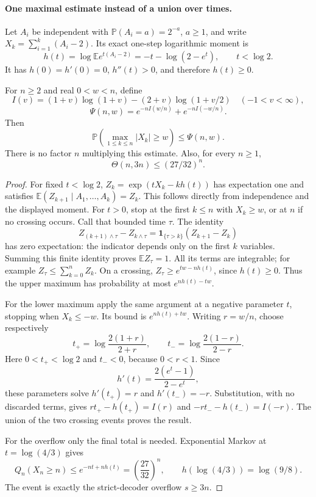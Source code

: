 \paragraph{One maximal estimate instead of a union over times.}
Let $A_i$ be independent with $\mathbb P(A_i=a)=2^{-a}$,
$a\ge1$, and write $X_k=\sum_{i=1}^k(A_i-2)$.
Its exact one-step logarithmic moment is
\[
 h(t)=\log\mathbb E e^{t(A_i-2)}
     =-t-\log(2-e^t),\qquad t<\log2.
\]
It has $h(0)=h'(0)=0$, $h''(t)>0$, and therefore $h(t)\ge0$.

\begin{proposition}
\label{prop:Mazur-maximal-tail}
For $n\ge2$ and real $0<w<n$, define
\[
 I(v)=(1+v)\log(1+v)-(2+v)\log(1+v/2)
       \quad(-1<v<\infty),
\]
\begin{equation}
 \Psi(n,w)=e^{-nI(w/n)}+e^{-nI(-w/n)}.
 \label{eq:Mazur-maximal-rate}
\end{equation}
Then
\begin{equation}
 \mathbb P\!\left(\max_{1\le k\le n}|X_k|\ge w\right)
       \le\Psi(n,w).
 \label{eq:Mazur-maximal-tail}
\end{equation}
There is no factor $n$ multiplying this estimate.
Also, for every $n\ge1$,
\begin{equation}
 \Theta(n,3n)\le(27/32)^n.
 \label{eq:Mazur-overflow-rate}
\end{equation}
\end{proposition}
\begin{proof}
For fixed $t<\log2$, $Z_k=\exp(tX_k-kh(t))$ has expectation
one and satisfies
$\mathbb E(Z_{k+1}\mid A_1,\ldots,A_k)=Z_k$.
This follows directly from independence and the displayed moment.
For $t>0$, stop at the first $k\le n$ with $X_k\ge w$, or at
$n$ if no crossing occurs. Call that bounded time $\tau$.
The identity
\[
 Z_{(k+1)\wedge\tau}-Z_{k\wedge\tau}
   =\mathbf1_{\{\tau>k\}}(Z_{k+1}-Z_k)
\]
has zero expectation: the indicator depends only on the first $k$
variables. Summing this finite identity proves $\mathbb E Z_\tau=1$.
All its terms are integrable; for example
$Z_\tau\le\sum_{k=0}^n Z_k$.
On a crossing, $Z_\tau\ge e^{tw-nh(t)}$, since $h(t)\ge0$.
Thus the upper maximum has probability at most $e^{nh(t)-tw}$.

For the lower maximum apply the same argument at a negative
parameter $t$, stopping when $X_k\le-w$. Its bound is
$e^{nh(t)+tw}$. Writing $r=w/n$, choose respectively
\[
 t_+=\log\frac{2(1+r)}{2+r},\qquad
 t_-=\log\frac{2(1-r)}{2-r}.
\]
Here $0<t_+<\log2$ and $t_-<0$, because $0<r<1$.
Since
\[
 h'(t)=\frac{2(e^t-1)}{2-e^t},
\]
these parameters solve $h'(t_+)=r$ and $h'(t_-)=-r$.
Substitution, with no discarded terms, gives
$rt_+-h(t_+)=I(r)$ and $-rt_--h(t_-)=I(-r)$.
The union of the two crossing events proves the result.

For the overflow only the final total is needed.
Exponential Markov at $t=\log(4/3)$ gives
\[
 Q_n(X_n\ge n)\le e^{-nt+nh(t)}
  =\left(\frac{27}{32}\right)^n,
 \qquad h(\log(4/3))=\log(9/8).
\]
The event is exactly the strict-decoder overflow $s\ge3n$.
\end{proof}

